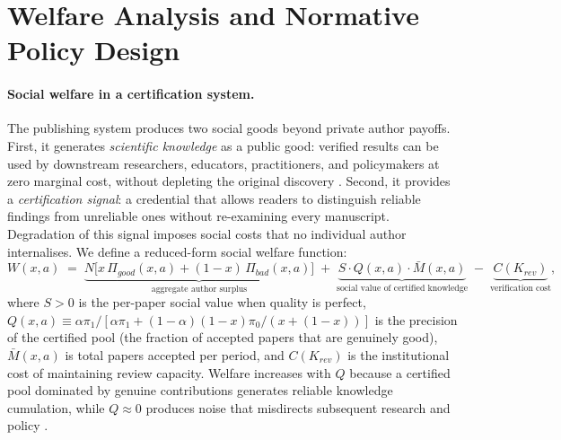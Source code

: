 \documentclass{article}
\begin{document}
\section{Welfare Analysis and Normative Policy Design}
\label{app:welfare}

\paragraph{Social welfare in a certification system.}
The publishing system produces two social goods beyond private author payoffs.
First, it generates \emph{scientific knowledge} as a public good: verified results can be used by downstream researchers, educators, practitioners, and policymakers at zero marginal cost, without depleting the original discovery \citep{DasguptaDavid1994}.
Second, it provides a \emph{certification signal}: a credential that allows readers to distinguish reliable findings from unreliable ones without re-examining every manuscript.
Degradation of this signal imposes social costs that no individual author internalises.
We define a reduced-form social welfare function:
\begin{equation}
  W(x,a) \;=\; \underbrace{N\bigl[x\,\Pi_{good}(x,a) + (1-x)\,\Pi_{bad}(x,a)\bigr]}_{\text{aggregate author surplus}}
  \;+\; \underbrace{S \cdot Q(x,a) \cdot \bar{M}(x,a)}_{\text{social value of certified knowledge}}
  \;-\; \underbrace{C(K_{rev})}_{\text{verification cost}},
  \label{eq:welfare}
\end{equation}
where $S > 0$ is the per-paper social value when quality is perfect, $Q(x,a) \equiv \alpha\pi_1 / [\alpha\pi_1 + (1-\alpha)(1-x)\pi_0/(x + (1-x))]$ is the precision of the certified pool (the fraction of accepted papers that are genuinely good), $\bar{M}(x,a)$ is total papers accepted per period, and $C(K_{rev})$ is the institutional cost of maintaining review capacity.
Welfare increases with $Q$ because a certified pool dominated by genuine contributions generates reliable knowledge cumulation, while $Q \approx 0$ produces noise that misdirects subsequent research and policy \citep{Ioannidis2005}.
\end{document}
